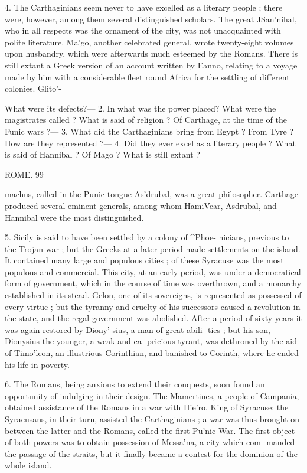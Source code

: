\documentclass[openany,a4paper]{memoir}
\begin{document}
4. The Carthaginians seem never to have excelled as a 
literary people ; there were, however, among them several 
distinguished scholars. The great JSan'nihal, who in all 
respects was the ornament of the city, was not unacquainted 
with polite literature. Ma'go, another celebrated general, 
wrote twenty-eight volumes upon husbandry, which were 
afterwards much esteemed by the Romans. There is still 
extant a Greek version of an account written by Eanno, 
relating to a voyage made by him with a considerable fleet 
round Africa for the settling of different colonies. Glito'- 

What were its defects?— 2. In what was the power placed? What 
were the magistrates called ? What is said of religion ? Of Carthage, 
at the time of the Funic wars ?— 3. What did the Carthaginians bring 
from Egypt ? From Tyre ? How are they represented ?— 4. Did they 
ever excel as a literary people ? What is said of Hannibal ? Of Mago ? 
What is still extant ? 



ROME. 99 

machus, called in the Punic tongue As'drubal, was a great 
philosopher. Carthage produced several eminent generals, 
among whom HamiVcar, Asdrubal, and Hannibal were the 
most distinguished. 

5. Sicily is said to have been settled by a colony of ^Phoe- 
nicians, previous to the Trojan war ; but the Greeks at a 
later period made settlements on the island. It contained 
many large and populous cities ; of these Syracuse was the 
most populous and commercial. This city, at an early period, 
was under a democratical form of government, which in the 
course of time was overthrown, and a monarchy established 
in its stead. Gelon, one of its sovereigns, is represented as 
possessed of every virtue ; but the tyranny and cruelty of 
his successors caused a revolution in the state, and the regal 
government was abolished. After a period of sixty years 
it was again restored by Diony' sius, a man of great abili- 
ties ; but his son, Dionysius the younger, a weak and ca- 
pricious tyrant, was dethroned by the aid of Timo'leon, an 
illustrious Corinthian, and banished to Corinth, where he 
ended his life in poverty. 

6. The Romans, being anxious to extend their conquests, 
soon found an opportunity of indulging in their design. 
The Mamertines, a people of Campania, obtained assistance 
of the Romans in a war with Hie'ro, King of Syracuse; 
the Syracusans, in their turn, assisted the Carthaginians ; a 
war was thus brought on between the latter and the Romans, 
called the first Pu'nic War. The first object of both powers 
was to obtain possession of Messa'na, a city which com- 
manded the passage of the straits, but it finally became a 
contest for the dominion of the whole island. 
\end{document}
